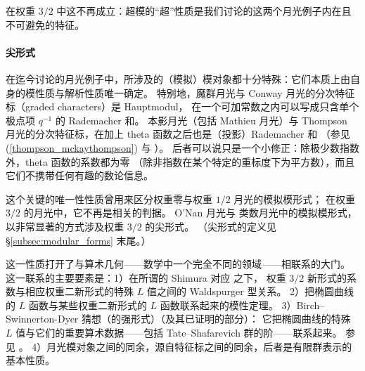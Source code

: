 \documentclass[11pt,a4paper,fontset=windows]{ctexart}
\numberwithin{equation}{section}
\newcommand{\myparagraph}[1]{\paragraph{#1}\mbox\\}
\newcommand{\eq}[1]{(\ref{#1})}
\begin{document}
在权重 $3/2$ 中这不再成立：超模的“超”性质是我们讨论的这两个月光例子内在且不可避免的特征。

\myparagraph{尖形式}

在迄今讨论的月光例子中，所涉及的（模拟）模对象都十分特殊：它们本质上由自身的模性质与解析性质唯一确定。
特别地，魔群月光与 Conway 月光的分次特征标（graded characters）是 Hauptmodul，
在一个可加常数之内可以写成只含单个极点项 $q^{-1}$ 的 Rademacher 和。
本影月光（包括 Mathieu 月光）与 Thompson 月光的分次特征标，在加上 theta 函数之后也是（投影）Rademacher 和
（参见 \eq{thompson_mckaythompson} 与 \cite{cheng2018weight}）。
后者可以说只是一个小修正：除极少数指数外，theta 函数的系数都为零
（除非指数在某个特定的重标度下为平方数），而且它们不携带任何有趣的数论信息。



这个关键的唯一性性质曾用来区分权重零与权重 $1/2$ 月光的模拟模形式；
在权重 $3/2$ 的月光中，它不再是相关的判据。
O'Nan 月光与 类数月光中的模拟模形式，以非常显著的方式涉及权重 $3/2$ 的尖形式。
（尖形式的定义见 \S\ref{subsec:modular_forms} 末尾。）

这一性质打开了与算术几何——数学中一个完全不同的领域——相联系的大门。
这一联系的主要要素是：1）在所谓的 Shimura 对应 \cite{MR783554} 之下，
权重 $3/2$ 新形式的系数与相应权重二新形式的特殊 $L$ 值之间的 Waldspurger 型关系。
2）把椭圆曲线的 $L$ 函数与某些权重二新形式的 $L$ 函数联系起来的模性定理。
3）Birch–Swinnerton-Dyer 猜想（的强形式）（及其已证明的部分）：
它把椭圆曲线的特殊 $L$ 值与它们的重要算术数据——包括 Tate–Shafarevich 群的阶——联系起来。
参见 \cite{MR833192,MR954295,MR3148103}。
4）月光模对象之间的同余，源自特征标之间的同余，后者是有限群表示的基本性质。


\end{document}
